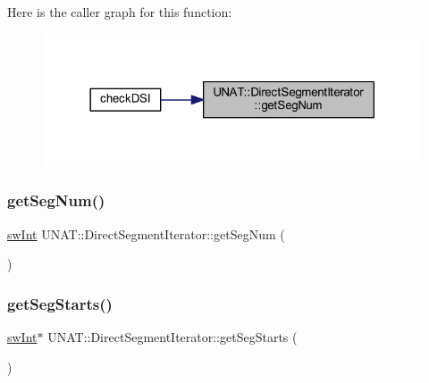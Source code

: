 Here is the caller graph for this function\+:
\nopagebreak
\begin{figure}[H]
\begin{center}
\leavevmode
\includegraphics[width=318pt]{classUNAT_1_1DirectSegmentIterator_a1c5edf64608f43c1bdf9a43ecb2b0b03_icgraph}
\end{center}
\end{figure}
\mbox{\label{classUNAT_1_1DirectSegmentIterator_a1c5edf64608f43c1bdf9a43ecb2b0b03}} 
\subsubsection{\texorpdfstring{getSegNum()}{getSegNum()}\hspace{0.1cm}{\footnotesize\ttfamily [2/2]}}
{\footnotesize\ttfamily \mbox{\hyperlink{include_2swMacro_8h_a113cf5f6b5377cdf3fac6aa4e443e9aa}{sw\+Int}} U\+N\+A\+T\+::\+Direct\+Segment\+Iterator\+::get\+Seg\+Num (\begin{DoxyParamCaption}{ }\end{DoxyParamCaption})\hspace{0.3cm}{\ttfamily [inline]}}

\mbox{\label{classUNAT_1_1DirectSegmentIterator_a125018398a70e40dbb02b56316efbf5a}} 
\subsubsection{\texorpdfstring{getSegStarts()}{getSegStarts()}\hspace{0.1cm}{\footnotesize\ttfamily [1/2]}}
{\footnotesize\ttfamily \mbox{\hyperlink{include_2swMacro_8h_a113cf5f6b5377cdf3fac6aa4e443e9aa}{sw\+Int}}$\ast$ U\+N\+A\+T\+::\+Direct\+Segment\+Iterator\+::get\+Seg\+Starts (\begin{DoxyParamCaption}{ }\end{DoxyParamCaption})\hspace{0.3cm}{\ttfamily [inline]}}


